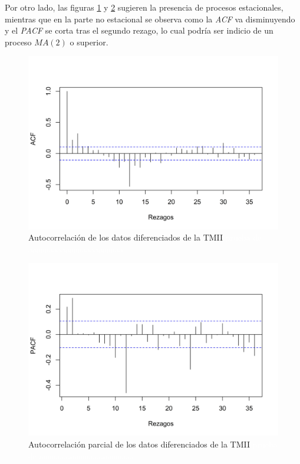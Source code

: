 \documentclass[
]{article}
\begin{document}
Por otro lado, las figuras \ref{fig:tmii_acf} y \ref{fig:tmii_pacf}
sugieren la presencia de procesos estacionales, mientras que en la parte
no estacional se observa como la \emph{ACF} va disminuyendo y el
\emph{PACF} se corta tras el segundo rezago, lo cual podría ser indicio
de un proceso \(MA(2)\) o superior.

\begin{figure}[H]
\includegraphics[width=1\linewidth,height=1\textheight]{Tesis_files/figure-latex/tmii_acf-1} \caption{Autocorrelación de los datos diferenciados de la TMII \textcolor{white}{prueba de aaaaaaaaaaaaaaaaaaaaaaa}}\label{fig:tmii_acf}
\end{figure}


\begin{figure}[H]
\includegraphics[width=1\linewidth,height=1\textheight]{Tesis_files/figure-latex/tmii_pacf-1} \caption{Autocorrelación parcial de los datos diferenciados de la TMII \textcolor{white}{prueba de aaaaaaaaaaaaaaaaaaaaaaa}}\label{fig:tmii_pacf}
\end{figure}
\end{document}
